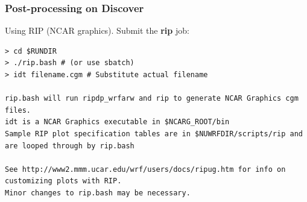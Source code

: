 \begin{frame}[fragile]
\frametitle{Post-processing on Discover}

Using RIP (NCAR graphics). Submit the \textbf{rip} job:
\begin{lstlisting}
> cd $RUNDIR
> ./rip.bash # (or use sbatch)
> idt filename.cgm # Substitute actual filename

rip.bash will run ripdp_wrfarw and rip to generate NCAR Graphics cgm files.
idt is a NCAR Graphics executable in $NCARG_ROOT/bin
Sample RIP plot specification tables are in $NUWRFDIR/scripts/rip and are looped through by rip.bash

See http://www2.mmm.ucar.edu/wrf/users/docs/ripug.htm for info on customizing plots with RIP. 
Minor changes to rip.bash may be necessary.
\end{lstlisting}

\end{frame}





